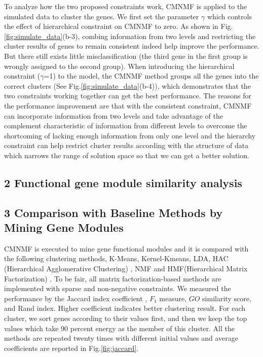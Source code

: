 \documentclass{bmcart}
\begin{document}
To analyze how the two proposed constraints work, CMNMF is applied to the simulated data to cluster the genes. We first set the parameter $\gamma$ which controls the effect of hierarchical constraint on CMNMF to zero. As shown in Fig.\ref{fig:simulate_data}(b-3), combing information from two levels and restricting the cluster results of genes to remain consistent indeed help improve the performance. But there still exists little misclassification (the third gene in the first group is wrongly assigned to the second group). When introducing the hierarchical constraint ($\gamma$=1) to the model, the CMNMF method groups all the genes into the correct clusters (See Fig.\ref{fig:simulate_data}(b-4)), which demonstrates that the two constraints working together can get the best performance. The reasons for the performance improvement are that with the consistent constraint, CMNMF can incorporate information from two levels and take advantage of the complement characteristic of information from different levels to overcome the shortcoming of lacking enough information from only one level and the hierarchy constraint can help restrict cluster results according with the structure of data which narrows the range of solution space so that we can get a better solution.

\subsection*{2 Functional gene module similarity analysis}

\subsection*{3 Comparison with Baseline Methods by Mining Gene Modules}
CMNMF is executed to mine gene functional modules and it is compared with the following clustering methods, K-Means, Kernel-Kmeans, LDA, HAC (Hierarchical Agglomerative Clustering) \cite{HAC}, NMF and HMF(Hierarchical Matrix Factorization) \cite{HMF}. To be fair, all matrix factorization-based methods are implemented with sparse and non-negative constraints. We measured the performance by the Jaccard index coefficient \cite{cluster_survey}, $F_1$ measure, $GO$ similarity score, and Rand index. Higher coefficient indicates better clustering result.
For each cluster, we sort genes according to their values first, and then we keep the top values which take 90 percent energy as the member of this cluster.  All the methods are repeated twenty times with different initial values and average coefficients are reported in Fig.\ref{fig:jaccard}.
\end{document}
